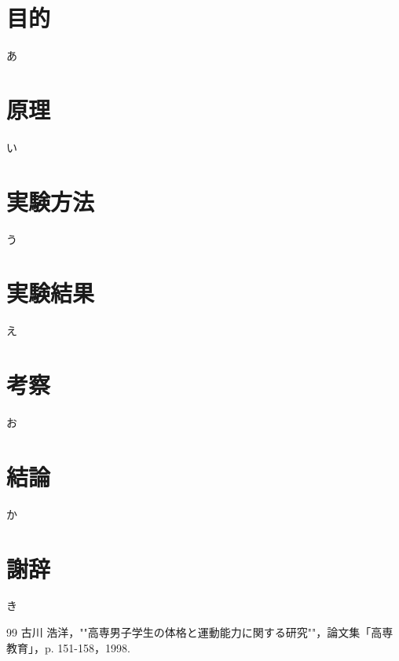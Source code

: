 \documentclass[11pt,dvipdfmx]{jarticle}
\begin{document}


\section{目的}
あ

\section{原理}
い

\section{実験方法}
う

\section{実験結果}
え

\section{考察}
お

\section{結論}
か

\section{謝辞}
き


\begin{thebibliography}{99}
 古川 浩洋，""高専男子学生の体格と運動能力に関する研究""，論文集「高専教育」，p. 151-158，1998.
\end{thebibliography}
\end{document}
